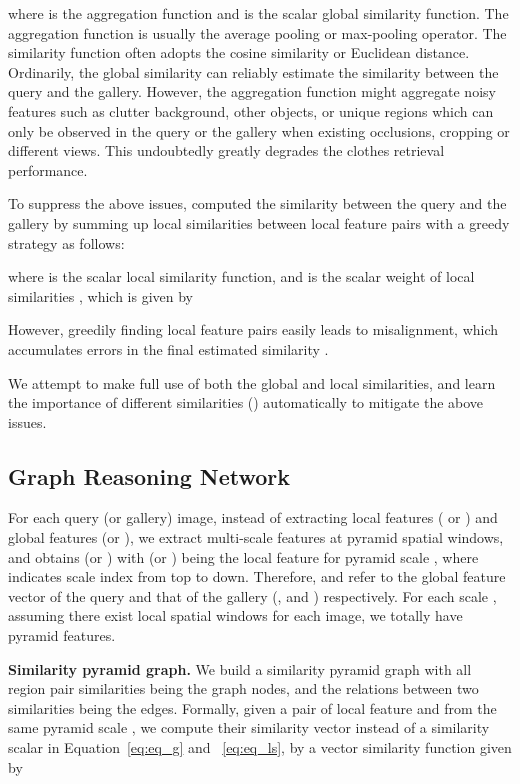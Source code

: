 \documentclass[10pt,twocolumn,letterpaper]{article}
\begin{document}
where  is the aggregation function and  is the scalar global similarity function. The aggregation function is usually the average pooling or max-pooling operator. The similarity function often adopts the cosine similarity or Euclidean distance. Ordinarily, the global similarity can reliably estimate the similarity between the query and the gallery. However, the aggregation function might aggregate noisy features such as clutter background, other objects, or unique regions which can only be observed in the query or the gallery when existing occlusions, cropping or different views. This undoubtedly greatly degrades the clothes retrieval performance.

To suppress the above issues, \cite{Wallraven2003,Boughorbel2014} computed the similarity between the query and the gallery by summing up local similarities between local feature pairs with a greedy strategy as follows:

where  is the scalar local similarity function, and  is the scalar weight of local similarities , which is given by

 However, greedily finding local feature pairs easily leads to misalignment, which accumulates errors in the final estimated similarity .


We attempt to make full use of both the global and local similarities, and learn the importance of different similarities (\ie  ) automatically to mitigate the above issues.


\subsection{Graph Reasoning Network}
For each query (or gallery) image, instead of extracting local features  ( or ) and global features  (or ), we extract multi-scale features at pyramid spatial windows, and obtains  (or ) with  (or ) being the  local feature for pyramid scale , where  indicates scale index from top to down.  Therefore,  and  refer to the global feature vector of the query and that of the gallery (\ie,  and )  respectively.  For each scale , assuming there exist  local spatial windows for each image, we totally have  pyramid features.

\textbf{Similarity pyramid graph.} We build a  similarity pyramid graph with all region pair similarities being the graph nodes, and the relations between two similarities
being the edges. Formally, given a pair of local feature  and  from the same pyramid scale , we compute their similarity vector  instead of a similarity scalar in Equation~\ref{eq:eq_g} and ~\ref{eq:eq_ls}, by a vector similarity function given by
\end{document}
